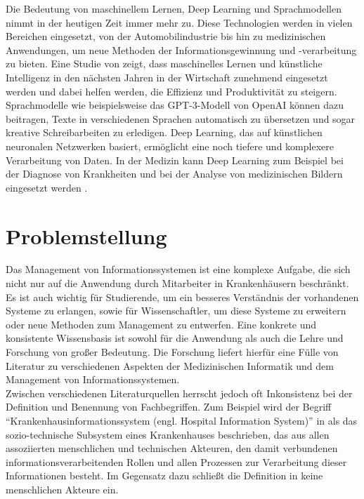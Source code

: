 Die Bedeutung von maschinellem Lernen, Deep Learning und Sprachmodellen nimmt in der heutigen Zeit immer mehr zu. Diese Technologien werden in vielen Bereichen eingesetzt, von der Automobilindustrie bis hin zu medizinischen Anwendungen, um neue Methoden der Informationsgewinnung und -verarbeitung zu bieten. 
Eine Studie von \citet{mckinsey} zeigt, dass maschinelles Lernen und künstliche Intelligenz in den nächsten Jahren in der Wirtschaft zunehmend eingesetzt werden und dabei helfen werden, die Effizienz und Produktivität zu steigern.
Sprachmodelle wie beispielsweise das GPT-3-Modell von OpenAI \citep{gpt3} können dazu beitragen, Texte in verschiedenen Sprachen automatisch zu übersetzen und sogar kreative Schreibarbeiten zu erledigen. 
Deep Learning, das auf künstlichen neuronalen Netzwerken basiert, ermöglicht eine noch tiefere und komplexere Verarbeitung von Daten. 
In der Medizin kann Deep Learning zum Beispiel bei der Diagnose von Krankheiten und bei der Analyse von medizinischen Bildern eingesetzt werden \citep{skincancer}.

\section{Problemstellung} \label{sec:problemstellung}
Das Management von Informationssystemen ist eine komplexe Aufgabe, die sich nicht nur auf die Anwendung durch Mitarbeiter in Krankenhäusern beschränkt. Es ist auch wichtig für Studierende, um ein besseres Verständnis der vorhandenen Systeme zu erlangen, sowie für Wissenschaftler, um diese Systeme zu erweitern oder neue Methoden zum Management zu entwerfen.
Eine konkrete und konsistente Wissensbasis ist sowohl für die Anwendung als auch die Lehre und Forschung von großer Bedeutung. Die Forschung liefert hierfür eine Fülle von Literatur zu verschiedenen Aspekten der Medizinischen Informatik und dem Management von Informationssystemen.\\

Zwischen verschiedenen Literaturquellen herrscht jedoch oft Inkonsistenz bei der Definition und Benennung von Fachbegriffen. 
Zum Beispiel wird der Begriff \enquote{Krankenhausinformationssystem (engl. Hospital Information System)} in \citet{kis_winter} als das sozio-technische Subsystem eines Krankenhauses beschrieben,
das aus allen assoziierten menschlichen und technischen Akteuren, den damit verbundenen informationsverarbeitenden Rollen und allen Prozessen zur Verarbeitung dieser Informationen besteht.
Im Gegensatz dazu schließt die Definition in \citet{kis_italy} keine menschlichen Akteure ein.\\

